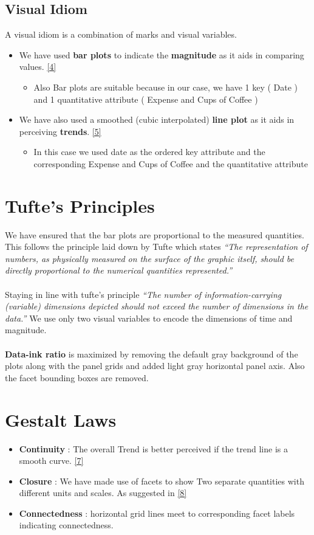 \documentclass[a4paper,11pt]{article}
\begin{document}
\begin{multicols}{2}
\subsection*{Visual Idiom}
A visual idiom is a combination of marks and visual variables.
\begin{itemize}
	\item We have used \textbf{bar plots} to indicate the \textbf{magnitude} as it aids in comparing values. \ref{4}
	\begin{itemize}
		\item Also Bar plots are suitable because in our case, we have 1 key ( Date ) and 1 quantitative  attribute ( Expense and Cups of Coffee )
	\end{itemize}
	\item We have also used a smoothed (cubic interpolated) \textbf{line plot} as it aids in perceiving \textbf{trends}. \ref{5}
	\begin{itemize}
		\item In this case we used date as the ordered key attribute and the corresponding Expense and Cups of Coffee and the quantitative attribute
	\end{itemize}
\end{itemize}
\section*{Tufte’s Principles}	
We have ensured that the bar plots are proportional to the measured quantities. This follows the principle laid down by Tufte which states \textit{“The representation of numbers, as physically measured on the surface of the graphic itself, should be directly proportional to the numerical quantities represented.”}\\\\
Staying in line with tufte’s principle \textit{“The number of information-carrying (variable) dimensions depicted should not exceed the number of dimensions in the data.”} We use only two visual variables to encode the dimensions of time and magnitude.\\\\
\textbf{Data-ink ratio} is maximized by removing the default gray background of the plots along with the panel grids and added light gray horizontal panel axis. Also the facet bounding boxes are removed.
\section*{Gestalt Laws}
\begin{itemize}
	\item \textbf{Continuity} : The overall Trend is better perceived if the trend line is a smooth curve. \ref{7} 
	\item \textbf{Closure} : We have made use of facets to show Two separate quantities with different units and scales. As suggested in \ref{8} 
	\item \textbf{Connectedness} : horizontal grid lines meet to corresponding facet labels indicating connectedness.
\end{itemize}

\end{multicols}
\end{document}
